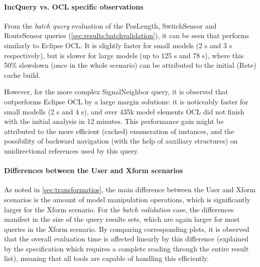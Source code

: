 \paragraph{IncQuery vs. OCL specific observations}

 
From the \emph{batch query} evaluation of the \textsf{PosLength},
\textsf{SwitchSensor} and \textsf{RouteSensor} queries
(\autoref{sec:results:batchvalidation}), it can be seen that \eiq{} performs
similarly to Eclipse OCL. It is slightly faster for small models (2 s and 3 s
respectively), but is slower for large models (up to 125 s and 78 s), where this
50\% slowdown (once in the whole scenario) can be attributed to the initial
(Rete) cache build.


However, for the more complex \textsf{SignalNeighbor} query, it is observed that
\eiq{} outperforms Eclipse OCL by a large margin solutions: it is noticeably
faster for small modells (2 s and 4 s), and over 435k model elements OCL did not
finish with the initial analysis in 12 minutes. This performance gain might be
attributed to the more efficient (cached) enumeration of instances, and the
possibility of backward navigation (with the help of auxiliary structures) on
unidirectional references used by this query.

\paragraph{Differences between the User and Xform scenarios}
As noted in \autoref{sec:transformatios}, the main difference between the \textsf{User} and \textsf{Xform} scenarios is the amount of model manipulation operations, which is significantly larger for the \textsf{Xform} scenario. For the \emph{batch validation} case, the differences manifest in the size of the query results sets, which are again larger for most queries in the \textsf{Xform} scenario. By comparing corresponding plots, it is observed that the overall evaluation time is affected linearly by this difference (explained by the specification which requires a complete reading through the entire result list), meaning that all tools are capable of handling this efficiently.


